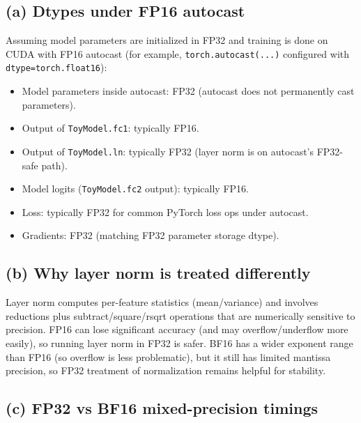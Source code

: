 \documentclass[11pt]{article}
\begin{document}
\subsection*{(a) Dtypes under FP16 autocast}
Assuming model parameters are initialized in FP32 and training is done on CUDA with FP16 autocast (for example, \texttt{torch.autocast(...)} configured with \texttt{dtype=torch.float16}):
\begin{itemize}
\item Model parameters inside autocast: FP32 (autocast does not permanently cast parameters).
\item Output of \texttt{ToyModel.fc1}: typically FP16.
\item Output of \texttt{ToyModel.ln}: typically FP32 (layer norm is on autocast's FP32-safe path).
\item Model logits (\texttt{ToyModel.fc2} output): typically FP16.
\item Loss: typically FP32 for common PyTorch loss ops under autocast.
\item Gradients: FP32 (matching FP32 parameter storage dtype).
\end{itemize}

\subsection*{(b) Why layer norm is treated differently}
Layer norm computes per-feature statistics (mean/variance) and involves reductions plus subtract/square/rsqrt operations that are numerically sensitive to precision. FP16 can lose significant accuracy (and may overflow/underflow more easily), so running layer norm in FP32 is safer. BF16 has a wider exponent range than FP16 (so overflow is less problematic), but it still has limited mantissa precision, so FP32 treatment of normalization remains helpful for stability.

\subsection*{(c) FP32 vs BF16 mixed-precision timings}
\begin{table}[h]
\centering
{}
\caption{Forward/backward/step means with and without BF16 autocast mixed precision (warmup=5, measured=10, ctx=128).}
\end{table}
\end{document}
